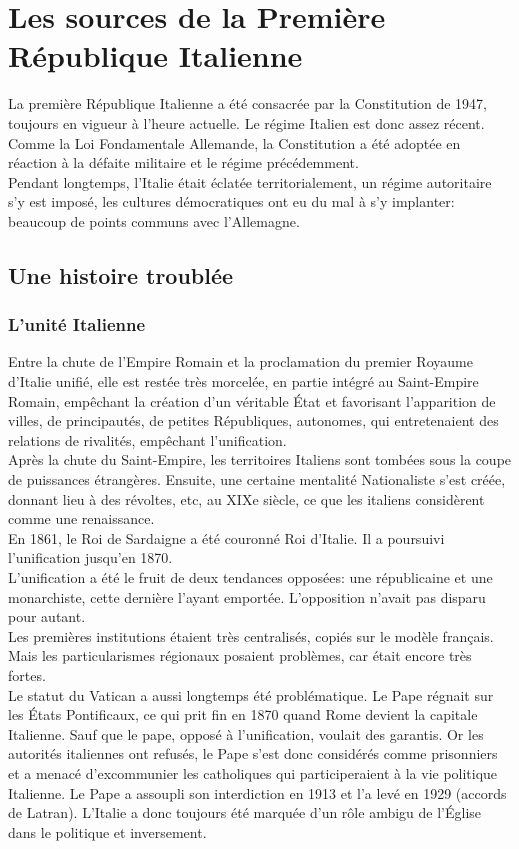 \documentclass[10pt, a4paper, openany]{book}
\begin{document}
\section{Les sources de la Première République Italienne}

La première République Italienne a été consacrée par la Constitution de 1947, toujours en vigueur à l'heure actuelle. Le régime Italien est donc assez récent. Comme la Loi Fondamentale Allemande, la Constitution a été adoptée en réaction à la défaite militaire et le régime précédemment. \\
Pendant longtemps, l'Italie était éclatée territorialement, un régime autoritaire s'y est imposé, les cultures démocratiques ont eu du mal à s'y implanter: beaucoup de points communs avec l'Allemagne.

\subsection{Une histoire troublée}

\subsubsection{L'unité Italienne}

Entre la chute de l'Empire Romain et la proclamation du premier Royaume d'Italie unifié, elle est restée très morcelée, en partie intégré au Saint-Empire Romain, empêchant la création d'un véritable État et favorisant l'apparition de villes, de principautés, de petites Républiques, autonomes, qui entretenaient des relations de rivalités, empêchant l'unification. \\
Après la chute du Saint-Empire, les territoires Italiens sont tombées sous la coupe de puissances étrangères. Ensuite, une certaine mentalité Nationaliste s'est créée, donnant lieu à des révoltes, etc, au XIXe siècle, ce que les italiens considèrent comme une renaissance. \\
En 1861, le Roi de Sardaigne a été couronné Roi d'Italie. Il a poursuivi l'unification jusqu'en 1870. \\
L'unification a été le fruit de deux tendances opposées: une républicaine et une monarchiste, cette dernière l'ayant emportée. L'opposition n'avait pas disparu pour autant. \\
Les premières institutions étaient très centralisés, copiés sur le modèle français. Mais les particularismes régionaux posaient problèmes, car était encore très fortes. \\
Le statut du Vatican a aussi longtemps été problématique. Le Pape régnait sur les États Pontificaux, ce qui prit fin en 1870 quand Rome devient la capitale Italienne. Sauf que le pape, opposé à l'unification, voulait des garantis. Or les autorités italiennes ont refusés, le Pape s'est donc considérés comme prisonniers et a menacé d'excommunier les catholiques qui participeraient à la vie politique Italienne. Le Pape a assoupli son interdiction en 1913 et l'a levé en 1929 (accords de Latran). L'Italie a donc toujours été marquée d'un rôle ambigu de l'Église dans le politique et inversement. 
\end{document}
